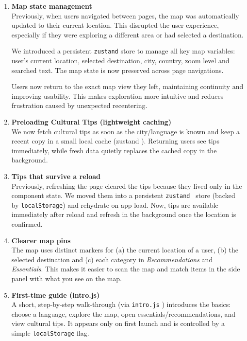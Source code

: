 \begin{enumerate}
    \item \textbf{Map state management} \\
    Previously, when users navigated between pages, the map was automatically updated to their current location. This disrupted the user experience, especially if they were exploring a different area or had selected a destination.  

    We introduced a persistent \texttt{zustand} \cite{zustand-docs} store to manage all key map variables: user’s current location, selected destination, city, country, zoom level and searched text. The map state is now preserved across page navigations.  

    Users now return to the exact map view they left, maintaining continuity and improving usability. This makes exploration more intuitive and reduces frustration caused by unexpected recentering.


    \item \textbf{Preloading Cultural Tips (lightweight caching)} \\
    We now fetch cultural tips as soon as the city/language is known and keep a recent copy in a small local cache (zustand \cite{zustand-docs}). Returning users see tips immediately, while fresh data quietly replaces the cached copy in the background.

    \item \textbf{Tips that survive a reload} \\
    Previously, refreshing the page cleared the tips because they lived only in the component state. We moved them into a persistent \texttt{zustand \cite{zustand-docs}} store (backed by \texttt{localStorage}) and rehydrate on app load. Now, tips are available immediately after reload and refresh in the background once the location is confirmed.

    \item \textbf{Clearer map pins} \\
    The map uses distinct markers for (a) the current location of a user, (b) the selected destination and (c) each category in \emph{Recommendations} and \emph{Essentials}. This makes it easier to scan the map and match items in the side panel with what you see on the map.

    \item \textbf{First-time guide (intro.js)} \\
    A short, step-by-step walk-through (via \texttt{intro.js} \cite{introjs-docs}) introduces the basics: choose a language, explore the map, open essentials/recommendations, and view cultural tips. It appears only on first launch and is controlled by a simple \texttt{localStorage} flag.


\end{enumerate}
